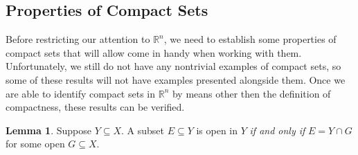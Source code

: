 \documentclass{article}
\newcommand{\R}{\mathbb{R}}
\theoremstyle{definition}
\newtheorem{lemma}{Lemma}[section]
\begin{document}
	\subsection{Properties of Compact Sets}
	Before restricting our attention to $ \R^n $, we need to establish some properties of compact sets that will allow come in handy when working with them. Unfortunately, we still do not have any nontrivial examples of compact sets, so some of these results will not have examples presented alongside them. Once we are able to identify compact sets in $ \R^n $ by means other then the definition of compactness, these results can be verified. 
	\begin{lemma}
		Suppose $ Y\subseteq X $. A subset $ E\subseteq Y$ is open in $ Y $ \textit{if and only if} $ E=Y\cap G $ for some open $ G\subseteq X $. 
	\end{lemma}
\end{document}
